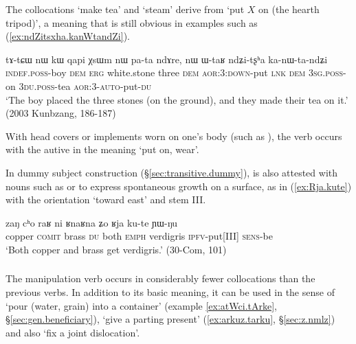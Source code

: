 The collocations  `make tea' and  `steam' derive from `put $X$ on (the hearth tripod)', a meaning that is still obvious in examples such as  (\ref{ex:ndZitsxha.kanWtandZi}).

\begin{exe}
\ex \label{ex:ndZitsxha.kanWtandZi}
\gll tɤ-tɕɯ nɯ kɯ qapi χsɯm nɯ pa-ta ndɤre, nɯ ɯ-taʁ  ndʑi-tʂʰa ka-nɯ-ta-ndʑi   \\
\textsc{indef}.\textsc{poss}-boy \textsc{dem} \textsc{erg} white.stone three \textsc{dem} \textsc{aor}:3\flobv{}:\textsc{down}-put \textsc{lnk} \textsc{dem} \textsc{3sg}.\textsc{poss}-on \textsc{3du}.\textsc{poss}-tea \textsc{aor}:3\flobv{}-\textsc{auto}-put-\textsc{du} \\
\glt `The boy placed the three stones (on the ground), and they made their tea on it.'  (2003 Kunbzang, 186-187)
\end{exe}

With head covers or implements worn on one's body (such as ), the verb  occurs with the autive in the meaning `put on, wear'.
 
In dummy subject construction (§\ref{sec:transitive.dummy}),  is also attested with nouns such as  or  to express  spontaneous growth on a surface, as in (\ref{ex:Rja.kute}) with the orientation `toward east'  and stem III.

\begin{exe}
\ex \label{ex:Rja.kute}
\gll zaŋ cʰo raʁ ni ʁnaʁna ʑo ʁja ku-te ɲɯ-ŋu \\
copper \textsc{comit} brass \textsc{du} both \textsc{emph} verdigris \textsc{ipfv}-put[III] \textsc{sens}-be \\
\glt `Both copper and brass get verdigris.' (30-Com, 101)
\end{exe}
 
\subsubsection{ } \label{sec:rku.lv}
The manipulation verb  occurs in considerably fewer collocations than the previous verbs. In addition to its basic meaning, it can be used in the sense of `pour (water, grain) into a container' (example \ref{ex:atWci.tArke}, §\ref{sec:gen.beneficiary}), `give a parting present' (\ref{ex:arkuz.tarku}, §\ref{sec:z.nmlz}) and also `fix a joint dislocation'.

